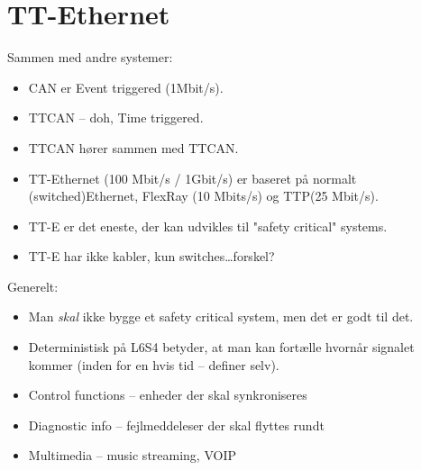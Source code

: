 \documentclass[oneside, 10pt]{article}
\begin{document}
\newpage
\section{TT-Ethernet}

Sammen med andre systemer:
\begin{itemize}
	\item CAN er Event triggered (1Mbit/s).
	\item TTCAN -- doh, Time triggered. 
	\item TTCAN hører sammen med TTCAN.
	\item TT-Ethernet (100 Mbit/s / 1Gbit/s) er baseret på normalt (switched)Ethernet, FlexRay (10 Mbits/s) og TTP(25 Mbit/s).
	\item TT-E er det eneste, der kan udvikles til "safety critical" systems.
	\item TT-E har ikke kabler, kun switches\dots forskel?
\end{itemize}

Generelt:
\begin{itemize}
	\item Man \emph{skal} ikke bygge et safety critical system, men det er godt til det.
	\item Deterministisk på L6S4 betyder, at man kan fortælle hvornår signalet kommer (inden for en hvis tid -- definer selv).
	\item Control functions -- enheder der skal synkroniseres
	\item Diagnostic info -- fejlmeddeleser der skal flyttes rundt
	\item Multimedia -- music streaming, VOIP
\end{itemize}
\end{document}
